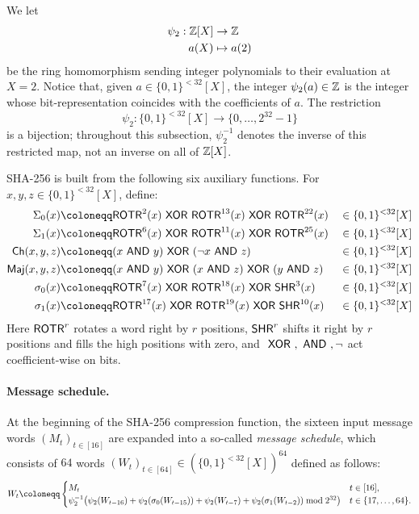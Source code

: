 \documentclass[11pt,letterpaper,usenames,dvipsnames]{article}
\begin{document}
We let 
%
\begin{equation}
\begin{aligned}
\psi_2: \mathbb{Z}[X]& \to \mathbb{Z}\\
a(X) &\mapsto a(2)
\end{aligned}
\end{equation}
be the ring homomorphism sending integer polynomials to their evaluation at
$X=2$. Notice that, given $a\in \{0,1\}^{<32}[X]$, the integer
$\psi_2(a) \in \mathbb{Z}$ is the integer whose bit-representation coincides with
the coefficients of $a$.  The restriction
\[
  \psi_2:\{0,1\}^{<32}[X]\longrightarrow\{0,\ldots,2^{32}-1\}
\]
is a bijection; throughout this subsection, $\psi_2^{-1}$ denotes the inverse
of this restricted map, not an inverse on all of $\mathbb{Z}[X]$.


SHA-256 is built from the following six auxiliary functions.
For $x,y,z\in\{0,1\}^{<32}[X]$, define:
\begin{equation}\label{eq:sha256_auxiliary_functions}
\begin{aligned}
\Sigma_0(x) &\coloneqq \ROTR^2(x)\xor\ROTR^{13}(x)\xor\ROTR^{22}(x) &&\in\{0,1\}^{<32}[X]\\
\Sigma_1(x)&\coloneqq \ROTR^6(x)\xor\ROTR^{11}(x)\xor\ROTR^{25}(x)&&\in\{0,1\}^{<32}[X]\\
\Ch(x,y,z) &\coloneqq (x\band y)\xor(\Not x\band z)&&\in\{0,1\}^{<32}[X]\\
\Maj(x,y,z)&\coloneqq (x\band y)\xor(x\band z)\xor(y\band z)&&\in\{0,1\}^{<32}[X]\\
\sigma_0(x) &\coloneqq \ROTR^7(x)\xor\ROTR^{18}(x)\xor\SHR^3(x)&&\in\{0,1\}^{<32}[X]\\
\sigma_1(x)&\coloneqq \ROTR^{17}(x)\xor\ROTR^{19}(x)\xor\SHR^{10}(x)&&\in\{0,1\}^{<32}[X]
\end{aligned}
\end{equation}
Here $\mathsf{ROTR}^r$ rotates a word right by $r$ positions, $\mathsf{SHR}^r$ shifts it
right by $r$ positions and fills the high positions with zero, and
$\ \mathsf{XOR}\ ,\ \mathsf{AND}\ ,\neg$ act coefficient-wise on bits.

\paragraph{Message schedule.}
At the beginning of the SHA-256 compression function, the sixteen input
message words $(M_t)_{t\in[16]}$ are expanded into a so-called
\emph{message schedule}, which consists of $64$ words
$(W_t)_{t\in[64]}\in(\{0,1\}^{<32}[X])^{64}$ defined as follows:
\begin{equation}\label{eq:sha256_message_schedule_def}
W_t \coloneqq 
\begin{cases}
M_t & t\in[16],\\
\psi_2^{-1}\!\left(
  \psi_2(W_{t-16})+\psi_2(\sigma_0(W_{t-15}))
  +\psi_2(W_{t-7})+\psi_2(\sigma_1(W_{t-2}))
  \bmod 2^\wordsize
\right) & t\in\{17,\dots,64\}.
\end{cases}
\end{equation}
\end{document}
